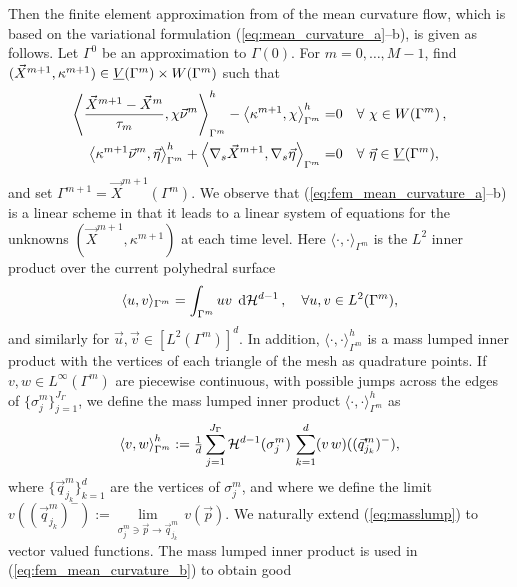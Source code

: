 Then the finite element approximation from \cite{triplejMC,gflows3d} of the
mean curvature flow, which is based on the variational formulation
(\ref{eq:mean_curvature_a}--b), is given as follows. Let $\Gamma^0$ be an
approximation to $\Gamma(0)$. For $m=0,\ldots,M-1$, find $(\vec X^{m+1},
\kappa^{m+1}) \in \underline{V}(\Gamma^m) \times W(\Gamma^m)$ such that
\begin{subequations}
\begin{align}
\left\langle \frac{\vec X^{m + 1} - \vec X^m}{\tau_m},
\chi\vec \nu^m\right\rangle_{\Gamma^m}^h - \left\langle\kappa^{m+1}, \chi
\right\rangle_{\Gamma^m}^h =& 0\quad \forall\ \chi \in
\Wh\,,\label{eq:fem_mean_curvature_a}\\
\left\langle\kappa^{m+1}\vec \nu^m, \vec \eta\right\rangle_{\Gamma^m}^h +
\left\langle\nabla_s\vec X^{m + 1},
\nabla_s\vec \eta\right\rangle_{\Gamma^m} =& 0\quad \forall\ \vec\eta \in \Vh,
\label{eq:fem_mean_curvature_b}
\end{align}
\end{subequations}
and set $\Gamma^{m+1} = \vec X^{m+1}(\Gamma^m)$. We observe that
(\ref{eq:fem_mean_curvature_a}--b) is a linear scheme in that it leads to a
linear system of equations for the unknowns $(\vec X^{m+1}, \kappa^{m+1})$ at
each time level. Here $\langle\cdot,\cdot\rangle_{\Gamma^m}$ is the $L^2$ inner
product over the current polyhedral surface
\begin{equation}
\langle u,v\rangle_{\Gamma^m} = \int_{\Gamma^m}uv\,\;{\rm d}{\cal H}^{d-1}\,,
\quad \forall u,v \in L^2(\Gamma^m),
\end{equation}
and similarly for $\vec u,\vec v\in [L^2(\Gamma^m)]^d$. In addition,
$\langle \cdot,\cdot\rangle_{\Gamma^m}^h$ is a mass lumped inner product with
the vertices of each triangle of the mesh as quadrature points. If $v,w \in
L^\infty(\Gamma^m)$ are piecewise continuous, with possible jumps
across the edges of $\{\sigma_j^m\}_{j=1}^{J_\Gamma}$, we define the mass
lumped inner product $\langle\cdot,\cdot\rangle_{\Gamma^m}^h$ as
\begin{equation} \label{eq:masslump}
\left\langle v, w \right\rangle^h_{\Gamma^m} :=
\tfrac1d \sum_{j=1}^{J_\Gamma} \mathcal{H}^{d-1}(\sigma^m_j)\,
\sum_{k=1}^d (v\,w)((\vec q^m_{j_k})^-),
\end{equation}
where $\{\vec q^m_{j_k}\}_{k=1}^d$ are the vertices of $\sigma^m_j$, and
where we define the limit $v((\vec q^m_{j_k})^-)
:= \underset{\sigma^m_j\ni \vec p\to \vec q^m_{j_k}}{\lim}\, v(\vec p)$. We
naturally extend (\ref{eq:masslump}) to vector valued functions. The mass
lumped inner product is used in (\ref{eq:fem_mean_curvature_b}) to obtain good
